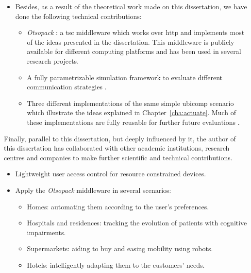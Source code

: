 \begin{itemize}
  \item Besides, as a result of the theoretical work made on this dissertation, we have done the following technical contributions:
    \begin{itemize}
      \item \emph{Otsopack} : a \ac{tsc} middleware which works over \ac{http} and implements most of the ideas presented in the dissertation.
            This middleware is publicly available for different computing platforms and has been used in several research projects.
      \item A fully parametrizable simulation framework to evaluate different communication strategies .
      \item Three different implementations of the same simple \ac{ubicomp} scenario which illustrate the ideas explained in Chapter~\ref{cha:actuate}.
	    Much of these implementations are fully reusable for further future evaluations .
    \end{itemize}
\end{itemize}


Finally, parallel to this dissertation, but deeply influenced by it, the author of this dissertation has collaborated with other academic institutions, research centres and companies to make further scientific and technical contributions.
\begin{itemize}
  \item Lightweight user access control for resource constrained devices. %
  \item Apply the \emph{Otsopack} middleware in several scenarios:
    \begin{itemize}
      \item Homes: automating them according to the user's preferences. %
      \item Hospitals and residences: tracking the evolution of patients with cognitive impairments.  %
      \item Supermarkets: aiding to buy and easing mobility using robots.
      \item Hotels: intelligently adapting them to the customers' needs.
    \end{itemize}
\end{itemize}
